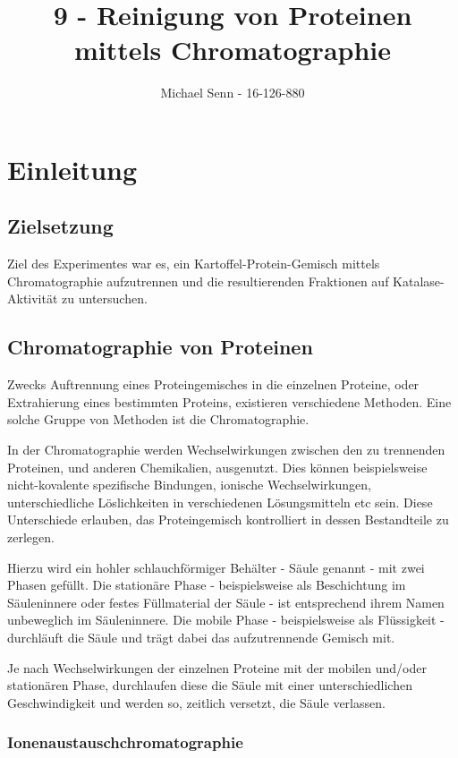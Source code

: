 \documentclass[a4paper,german]{scrreprt}
\title{9 - Reinigung von Proteinen mittels Chromatographie}
\author{Michael Senn \maillink{michael.senn@students.unibe.ch} - 16-126-880}
\date{\printdate}
\begin{document}
\maketitle

\chapter{Einleitung}

\section{Zielsetzung}

Ziel des Experimentes war es, ein Kartoffel-Protein-Gemisch mittels
Chromatographie aufzutrennen und die resultierenden Fraktionen auf
Katalase-Aktivität zu untersuchen.

\section{Chromatographie von Proteinen}

Zwecks Auftrennung eines Proteingemisches in die einzelnen Proteine, oder
Extrahierung eines bestimmten Proteins, existieren verschiedene Methoden. Eine
solche Gruppe von Methoden ist die Chromatographie.

In der Chromatographie werden Wechselwirkungen zwischen den zu trennenden
Proteinen, und anderen Chemikalien, ausgenutzt. Dies können beispielsweise
nicht-kovalente spezifische Bindungen, ionische Wechselwirkungen,
unterschiedliche Löslichkeiten in verschiedenen Lösungsmitteln etc sein. Diese
Unterschiede erlauben, das Proteingemisch kontrolliert in dessen Bestandteile
zu zerlegen.

Hierzu wird ein hohler schlauchförmiger Behälter - Säule genannt - mit zwei
Phasen gefüllt. Die stationäre Phase - beispielsweise als Beschichtung im
Säuleninnere oder festes Füllmaterial der Säule - ist entsprechend ihrem Namen
unbeweglich im Säuleninnere. Die mobile Phase - beispielsweise als Flüssigkeit
- durchläuft die Säule und trägt dabei das aufzutrennende Gemisch mit.

Je nach Wechselwirkungen der einzelnen Proteine mit der mobilen und/oder
stationären Phase, durchlaufen diese die Säule mit einer unterschiedlichen
Geschwindigkeit und werden so, zeitlich versetzt, die Säule verlassen.

\subsection{Ionenaustauschchromatographie}
\end{document}
